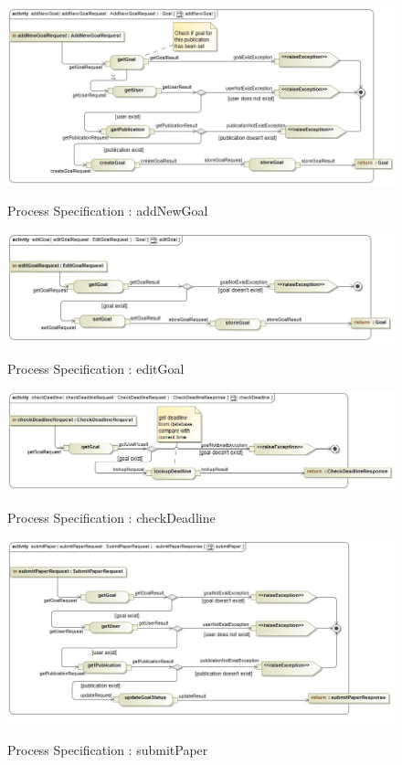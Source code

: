 \documentclass{article}
\begin{document}
		\begin{figure}[H]
			\includegraphics[width=\textwidth]{Ruan_Diagrams/addNewGoal_processSpecification.jpg}  \\
			\caption{Process Specification : addNewGoal}
		\end{figure}
		\begin{figure}[H]
			\includegraphics[width=\textwidth]{Ruan_Diagrams/editGoal_processSpecification.jpg}  \\
			\caption{Process Specification : editGoal}
		\end{figure}
		\begin{figure}[H]
			\includegraphics[width=\textwidth]{Ruan_Diagrams/checkdeadline_processSpecification.jpg}  \\
			\caption{Process Specification : checkDeadline}
		\end{figure}
  		\begin{figure}[H]
  			\includegraphics[width=\textwidth]{Ruan_Diagrams/submitPaper_processSpecification.jpg}  \\
  			\caption{Process Specification : submitPaper}
  		\end{figure}
\end{document}
